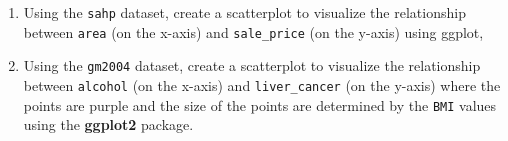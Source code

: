 \documentclass[
]{book}
\begin{document}
\begin{enumerate}
\def\labelenumi{\arabic{enumi}.}
\item
  Using the \texttt{sahp} dataset, create a scatterplot to visualize the relationship between \texttt{area} (on the x-axis) and \texttt{sale\_price} (on the y-axis) using ggplot,
\item
  Using the \texttt{gm2004} dataset, create a scatterplot to visualize the relationship between \texttt{alcohol} (on the x-axis) and \texttt{liver\_cancer} (on the y-axis) where the points are purple and the size of the points are determined by the \texttt{BMI} values using the \textbf{ggplot2} package.
\end{enumerate}

  
\end{document}
